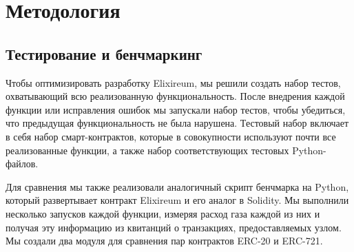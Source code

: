 \chapter{Методология}
\label{chap:met}

\section{Тестирование и бенчмаркинг}
\label{sec:test_suite}


Чтобы оптимизировать разработку Elixireum, мы решили создать набор тестов, охватывающий всю реализованную функциональность. После внедрения каждой функции или исправления ошибок мы запускали набор тестов, чтобы убедиться, что предыдущая функциональность не была нарушена. Тестовый набор включает в себя набор смарт-контрактов, которые в совокупности используют почти все реализованные функции, а также набор соответствующих тестовых Python-файлов.

Для сравнения мы также реализовали аналогичный скрипт бенчмарка на Python, который развертывает контракт Elixireum и его аналог в Solidity. Мы выполнили несколько запусков каждой функции, измеряя расход газа каждой из них и получая эту информацию из квитанций о транзакциях, предоставляемых узлом. Мы создали два модуля для сравнения пар контрактов ERC-20 и ERC-721.